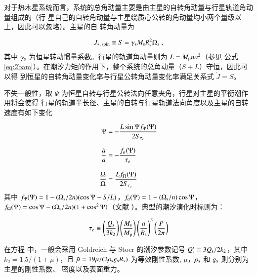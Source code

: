 对于热木星系统而言，系统的总角动量主要是由主星的自转角动量与行星轨道角动量组成的（行
星自己的自转角动量与主星绕质心公转的角动量均小两个量级以上，因此可以忽略）。主星的自
转角动量为

\begin{equation} \label{eq:spinam}
J_{*,\,\mathrm{spin}} \equiv S = \gamma_\mathrm{s} M_\mathrm{s} R_\mathrm{s}^2 \Omega_\mathrm{s} \ ,
\end{equation} 
其中 $\gamma_\mathrm{s}$ 为恒星转动惯量系数。行星的轨道角动量则为 $L = M_\mathrm{p}na^2$（参见
公式 \ref{eq:2bam}）。在潮汐力矩的作用下，整个系统的总角动量（$S+L$）守恒，因此可以得
到恒星的自转角动量变化率与行星公转角动量变化率满足关系式 $\dot{J} = \dot{S}$。

不失一般性，取 $\Psi$ 为恒星自转与行星公转法向任意夹角，行星对主星的平衡潮作用将会使得
行星的轨道半长径、主星的自转与行星轨道法向角度以及主星的自转速度有如下变化

\begin{subequations} \label{eq:tidalevo}
\setlength{\jot}{10pt}
\begin{align}
   \dot{\Psi} &= - \frac{L\sin \Psi f_\Psi(\Psi)}{2S_{\tau_e}}     \label{eq:obevo} \\
    \frac{\dot{a}}{a} &= - \frac{f_a(\Psi)}{\tau_e}   \label{eq:smaevo}  \\
    \frac{\dot{\Omega}}{\Omega} & = \frac{Lf_\Omega(\Psi)}{2S_{\tau_e}} \label{eq:spinevo}
\end{align}
\end{subequations} 
其中 $f_\Psi(\Psi) = 1 - (\Omega_\mathrm{s}/2n)(\cos\Psi - S/L)$，$f_a(\Psi) = 1 - (\Omega_\mathrm{s}/n)\cos\Psi$，
$f_\Omega(\Psi) = \cos\Psi - (\Omega_\mathrm{s}/2n)(1+ \cos^2\Psi)$（文献 ）。典型的潮汐演化时标则为：

\begin{equation} \label{eq:taue}
\tau_e \equiv \left( {Q_\mathrm{s} \over 3 k_2} \right) \left( {M_\mathrm{s} \over M_\mathrm{p}}\right)
\left( {a \over R_\mathrm{s}}\right)^5 \left( {P \over 2 \pi} \right) 
\end{equation} 

在方程 \label{eq:taue} 中，一般会采用 Goldreich 与 Stoer 的潮汐参数记号 $Q_\mathrm{s}^\prime \equiv 3 
Q_\mathrm{s}/2k_2$，其中 $k_2 =1.5/(1+{\tilde \mu})$，且 ${\tilde \mu} = 19 \mu/(2 \rho_\mathrm{s} 
g_\mathrm{s} R_\mathrm{s})$ 为等效刚性系数, $\mu$，$\rho_\mathrm{s}$ 和 $g_\mathrm{s}$ 则分别为主星的刚性系数、
密度以及表面重力。

